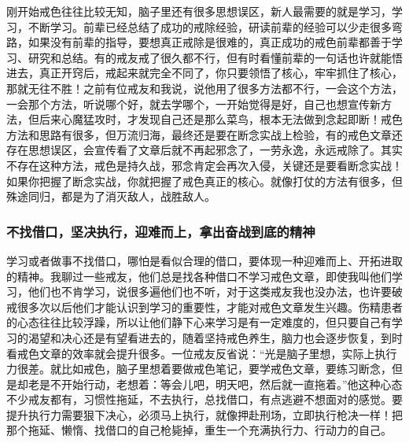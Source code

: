 刚开始戒色往往比较无知，脑子里还有很多思想误区，新人最需要的就是学习，学习，不断学习。前辈已经总结了成功的戒除经验，研读前辈的经验可以少走很多弯路，如果没有前辈的指导，要想真正戒除是很难的，真正成功的戒色前辈都善于学习、研究和总结。有的戒友戒了很久都不行，但有时看懂前辈的一句话也许就能悟进去，真正开窍后，戒起来就完全不同了，你只要领悟了核心，牢牢抓住了核心，那就无往不胜！之前有位戒友和我说，说他用了很多方法都不行，一会这个方法，一会那个方法，听说哪个好，就去学哪个，一开始觉得是好，自己也想宣传新方法，但后来心魔猛攻时，才发现自己还是那么菜鸟，根本无法做到念起即断！戒色方法和思路有很多，但万流归海，最终还是要在断念实战上检验，有的戒色文章还存在思想误区，会宣传看了文章后就不再起邪念了，一劳永逸，永远戒除了。其实不存在这种方法，戒色是持久战，邪念肯定会再次入侵，关键还是要看断念实战！如果你把握了断念实战，你就把握了戒色真正的核心。就像打仗的方法有很多，但殊途同归，都是为了消灭敌人，战胜敌人。

\subsubsection{不找借口，坚决执行，迎难而上，拿出奋战到底的精神}

学习或者做事不找借口，哪怕是看似合理的借口，要体现一种迎难而上、开拓进取的精神。我聊过一些戒友，他们总是找各种借口不学习戒色文章，即使我叫他们学习，他们也不肯学习，说很多遍他们也不听，对于这类戒友我也没办法，也许要破戒很多次以后他们才能认识到学习的重要性，才能对戒色文章发生兴趣。伤精患者的心态往往比较浮躁，所以让他们静下心来学习是有一定难度的，但只要自己有学习的渴望和决心还是有望看进去的，随着坚持戒色养生，脑力也会逐步恢复，到时看戒色文章的效率就会提升很多。一位戒友反省说：“光是脑子里想，实际上执行力很差。就比如戒色，脑子里想着要做戒色笔记，要学戒色文章，要练习断念，但是却老是不开始行动，老想着：等会儿吧，明天吧，然后就一直拖着。”他这种心态不少戒友都有，习惯性拖延，不去执行，总找借口，有点逃避不想面对的感觉。要提升执行力需要狠下决心，必须马上执行，就像押赴刑场，立即执行枪决一样！把那个拖延、懒惰、找借口的自己枪毙掉，重生一个充满执行力、行动力的自己。

